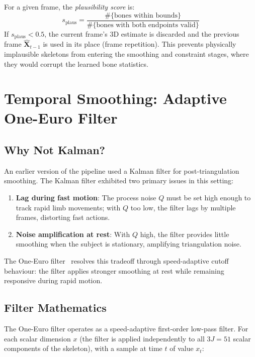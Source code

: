 \documentclass[11pt,a4paper]{article}
\begin{document}
For a given frame, the \emph{plausibility score} is:
\begin{equation}
  s_\text{plaus} = \frac{\#\{\text{bones within bounds}\}}{\#\{\text{bones with both endpoints valid}\}}
\end{equation}
If $s_\text{plaus} < 0.5$, the current frame's 3D estimate is discarded and the
previous frame $\hat{\mathbf{X}}_{t-1}$ is used in its place (frame repetition). This
prevents physically implausible skeletons from entering the smoothing and constraint
stages, where they would corrupt the learned bone statistics.

\section{Temporal Smoothing: Adaptive One-Euro Filter}

\subsection{Why Not Kalman?}

An earlier version of the pipeline used a Kalman filter for
post-triangulation smoothing. The Kalman filter exhibited two primary issues
in this setting:

\begin{enumerate}
  \item \textbf{Lag during fast motion}: The process noise $Q$ must be set high enough
    to track rapid limb movements; with $Q$ too low, the filter lags by multiple
    frames, distorting fast actions.
  \item \textbf{Noise amplification at rest}: With $Q$ high, the filter provides
    little smoothing when the subject is stationary, amplifying triangulation noise.
\end{enumerate}

The One-Euro filter~\cite{casiez2012} resolves this tradeoff through
speed-adaptive cutoff behaviour: the filter applies stronger smoothing at rest
while remaining responsive during rapid motion.

\subsection{Filter Mathematics}

The One-Euro filter operates as a speed-adaptive first-order low-pass filter. For each
scalar dimension $x$ (the filter is applied independently to all $3J = 51$ scalar
components of the skeleton), with a sample at time $t$ of value $x_t$:
\end{document}
